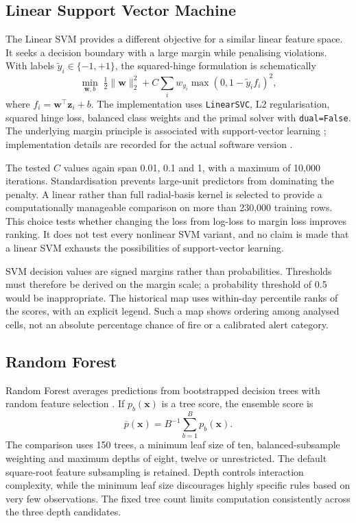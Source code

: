 \documentclass[conference,a4paper]{IEEEtran}
\begin{document}
\subsection{Linear Support Vector Machine}
The Linear SVM provides a different objective for a similar linear feature space. It seeks a decision boundary with a large margin while penalising violations. With labels $\tilde y_i\in\{-1,+1\}$, the squared-hinge formulation is schematically
\begin{equation}
\min_{\mathbf w,b}\;\tfrac12\|\mathbf w\|_2^2+
C\sum_i w_{y_i}\max(0,1-\tilde y_i f_i)^2,
\end{equation}
where $f_i=\mathbf w^\top\mathbf z_i+b$. The implementation uses \texttt{LinearSVC}, L2 regularisation, squared hinge loss, balanced class weights and the primal solver with \texttt{dual=False}. The underlying margin principle is associated with support-vector learning \citep{cortes}; implementation details are recorded for the actual software version \citep{sklearnsvm}.

The tested $C$ values again span 0.01, 0.1 and 1, with a maximum of 10,000 iterations. Standardisation prevents large-unit predictors from dominating the penalty. A linear rather than full radial-basis kernel is selected to provide a computationally manageable comparison on more than 230,000 training rows. This choice tests whether changing the loss from log-loss to margin loss improves ranking. It does not test every nonlinear SVM variant, and no claim is made that a linear SVM exhausts the possibilities of support-vector learning.

SVM decision values are signed margins rather than probabilities. Thresholds must therefore be derived on the margin scale; a probability threshold of 0.5 would be inappropriate. The historical map uses within-day percentile ranks of the scores, with an explicit legend. Such a map shows ordering among analysed cells, not an absolute percentage chance of fire or a calibrated alert category.

\subsection{Random Forest}
Random Forest averages predictions from bootstrapped decision trees with random feature selection \citep{breiman}. If $p_b(\mathbf x)$ is a tree score, the ensemble score is
\begin{equation}
\bar p(\mathbf x)=B^{-1}\sum_{b=1}^{B}p_b(\mathbf x).
\end{equation}
The comparison uses 150 trees, a minimum leaf size of ten, balanced-subsample weighting and maximum depths of eight, twelve or unrestricted. The default square-root feature subsampling is retained. Depth controls interaction complexity, while the minimum leaf size discourages highly specific rules based on very few observations. The fixed tree count limits computation consistently across the three depth candidates.
\end{document}
